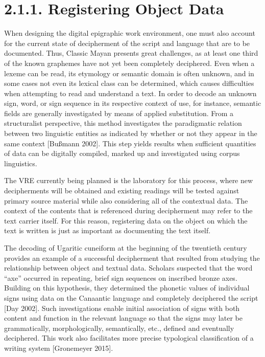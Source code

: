 \documentclass[amsthm,ebook]{saparticle}
\begin{document}
\section[2.1.1. Registering Object Data ]{2.1.1. Registering Object Data }
When designing the digital epigraphic work environment, one must also account for the current state of decipherment of
the script and language that are to be documented. Thus, Classic Mayan presents great challenges, as at least one third
of the known graphemes have not yet been completely deciphered. Even when a lexeme can be read, its etymology or
semantic domain is often unknown, and in some cases not even its lexical class can be determined, which causes
difficulties when attempting to read and understand a text. In order to decode an unknown sign, word, or sign sequence
in its respective context of use, for instance, semantic fields are generally investigated by means of applied
substitution. From a structuralist perspective, this method investigates the paradigmatic relation between two
linguistic entities as indicated by whether or not they appear in the same context [Bußmann 2002]. This step yields
results when sufficient quantities of data can be digitally compiled, marked up and investigated using corpus
linguistics. 

The VRE currently being planned is the laboratory for this process, where new decipherments will be obtained and
existing readings will be tested against primary source material while also considering all of the contextual data. The
context of the contents that is referenced during decipherment may refer to the text carrier itself. For this reason,
registering data on the object on which the text is written is just as important as documenting the text itself. 

The decoding of Ugaritic cuneiform at the beginning of the twentieth century provides an example of a successful
decipherment that resulted from studying the relationship between object and textual data. Scholars suspected that the
word “axe” occurred in repeating, brief sign sequences on inscribed bronze axes. Building on this hypothesis, they
determined the phonetic values of individual signs using data on the Canaantic language and completely deciphered the
script [Day 2002]. Such investigations enable initial association of signs with both content and function in the
relevant language so that the signs may later be grammatically, morphologically, semantically, etc., defined and
eventually deciphered. This work also facilitates more precise typological classification of a writing system
[Gronemeyer 2015].
\end{document}
